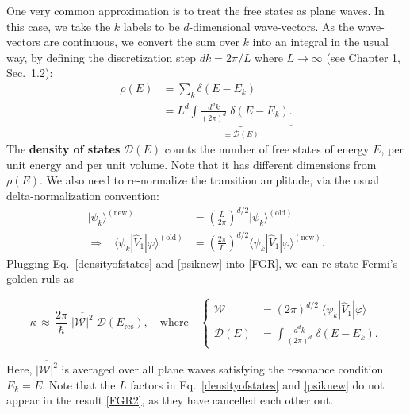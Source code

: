 \documentclass[prx,12pt]{revtex4-2}
\begin{document}
One very common approximation is to treat the free states as plane
waves.  In this case, we take the $k$ labels to be $d$-dimensional
wave-vectors.  As the wave-vectors are continuous, we convert the sum
over $k$ into an integral in the usual way, by defining the
discretization step $dk = 2\pi/L$ where $L \rightarrow \infty$ (see
Chapter 1, Sec.~1.2):
\begin{align}
  \rho(E) &= \sum_k \delta(E-E_k) \nonumber \\
  &= L^d \underbrace{\int \frac{d^d k}{(2\pi)^d} \; \delta(E - E_k).}_{\equiv \displaystyle \mathcal{D}(E)} \label{densityofstates}
\end{align}
The \textbf{density of states} $\mathcal{D}(E)$ counts the number of
free states of energy $E$, per unit energy and per unit volume.  Note
that it has different dimensions from $\rho(E)$.  We also need to
re-normalize the transition amplitude, via the usual
delta-normalization convention:
\begin{align}
  |\psi_k\rangle^{(\textrm{new})}
  &= \left(\frac{L}{2\pi}\right)^{d/2} |\psi_{k}\rangle^{(\textrm{old})} \\
  \Rightarrow \;\;\;
  \langle\psi_{k}| \hat{V}_1|\varphi\rangle^{(\textrm{old})}
  &= \left(\frac{2\pi}{L}\right)^{d/2} \langle\psi_{k}| \hat{V}_1|\varphi\rangle^{(\textrm{new})}.
  \label{psiknew}
\end{align}
Plugging Eq.~\eqref{densityofstates} and \eqref{psiknew} into
\eqref{FGR}, we can re-state Fermi's golden rule as
\begin{framed}
  \begin{equation}
    \kappa
    \,\approx\, \frac{2\pi}{\hbar} \;
    \overline{\big|\mathcal{W}\big|^2} \;
    \mathcal{D}(E_{\mathrm{res}}),
    \quad \mathrm{where} \quad \left\{
    \begin{aligned}
      \mathcal{W}
      &= (2\pi)^{d/2} \;
      \langle\psi_{k}| \hat{V}_1|\varphi\rangle \\
      \mathcal{D}(E) &= \int \frac{d^dk}{(2\pi)^d} \; \delta(E-E_k).
    \end{aligned}\right.
    \label{FGR2}
  \end{equation}
\end{framed}
\vskip -0.1in
\noindent
Here, $\overline{\big|\mathcal{W}\big|^2}$ is averaged over all plane
waves satisfying the resonance condition $E_k = E$.  Note that the $L$
factors in Eq.~\eqref{densityofstates} and \eqref{psiknew} do not
appear in the result \eqref{FGR2}, as they have cancelled each other
out.
\end{document}
